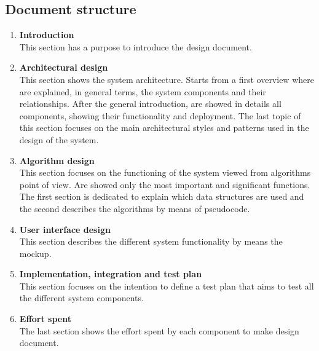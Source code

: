 \subsection{Document structure}
\begin{enumerate}
	\item \textbf{Introduction}\\
		This section has a purpose to introduce the design document. 
	\item \textbf{Architectural design}\\
		This section shows the system architecture. Starts from a first overview where are explained, in general terms, the system components and their relationships.
		After the general introduction, are showed in details all components, showing their functionality and deployment.
		The last topic of this section focuses on the main architectural styles and patterns used in the design of the system. 
	\item \textbf{Algorithm design}\\
		This section focuses on the functioning of the system viewed from algorithms point of view. Are showed only the most important and significant functions.
		The first section is dedicated to explain which data structures are used and the second describes the algorithms by means of pseudocode.
	\item \textbf{User interface design}\\
		This section describes the different system functionality by means the mockup.  
	\item \textbf{Implementation, integration and test plan}\\
		This section focuses on the intention to define a test plan that aims to test all the different system components.
	\item \textbf{Effort spent}\\
		The last section shows the effort spent by each component to make design document.
\end{enumerate}